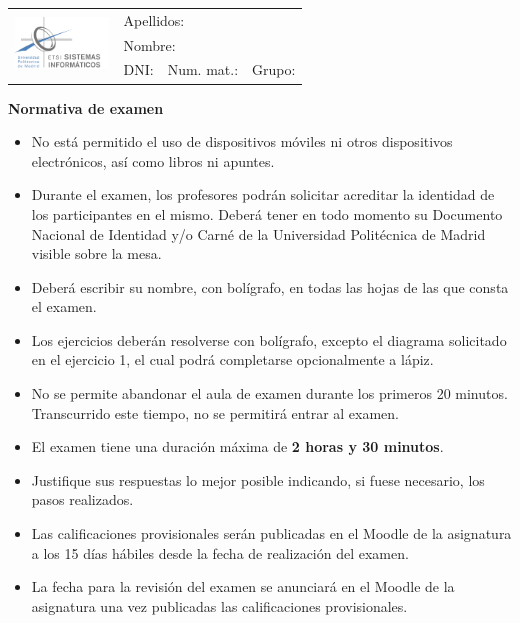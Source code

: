 \documentclass[12pt,a4paper,addpoints,answers]{exam}
\def\studentdata{
    \begin{table}[t]
        \renewcommand{\arraystretch}{1.2}
        \small
        \centering
        \begin{tabular}{|l|p{4cm}|p{4cm}|p{2.5cm}|}
            \hline
            \multirow{3}{*}{\includegraphics[width=2.5cm]{logos/etsisi.png}} & \multicolumn{3}{l|}{Apellidos:} \\ \cline{2-4} 
                                                                             & \multicolumn{3}{l|}{Nombre:}    \\ \cline{2-4} 
                                                                             & DNI:  & Num. mat.: & Grupo: \\ \hline
        \end{tabular}%
    \end{table}
}
\begin{document}
\studentdata

\begin{center}\textbf{Normativa de examen}\end{center}
\begin{itemize}
    \item No está permitido el uso de dispositivos móviles ni otros dispositivos electrónicos, así como libros ni apuntes.
    \item Durante el examen, los profesores podrán solicitar acreditar la identidad de los participantes en el mismo. Deberá tener en todo momento su Documento Nacional de Identidad y/o Carné de la Universidad Politécnica de Madrid visible sobre la mesa.
    \item Deberá escribir su nombre, con bolígrafo, en todas las hojas de las que consta el examen.
    \item Los ejercicios deberán resolverse con bolígrafo, excepto el diagrama solicitado en el ejercicio 1, el cual podrá completarse opcionalmente a lápiz.
    \item No se permite abandonar el aula de examen durante los primeros 20 minutos. Transcurrido este tiempo, no se permitirá entrar al examen. 
    \item El examen tiene una duración máxima de \textbf{2 horas y 30 minutos}. 
    \item Justifique sus respuestas lo mejor posible indicando, si fuese necesario, los pasos realizados.
    \item Las calificaciones provisionales serán publicadas en el Moodle de la asignatura a los 15 días hábiles desde la fecha de realización del examen.
    \item La fecha para la revisión del examen se anunciará en el Moodle de la asignatura una vez publicadas las calificaciones provisionales.
\end{itemize}
\newpage
\end{document}
